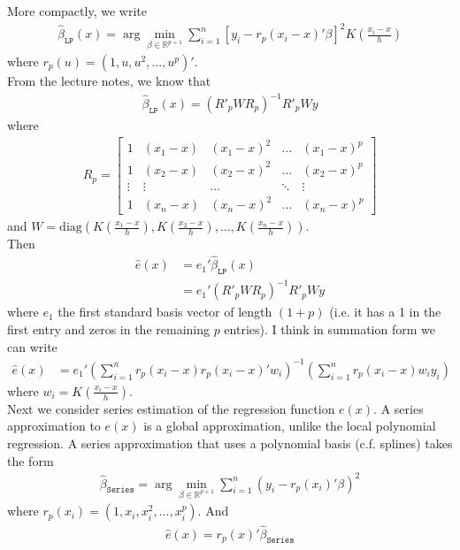\documentclass[12pt]{article}
\newcommand{\R}{\mathbb{R}}
\newcommand{\mtx}[1]{\ensuremath{\bm{\mathit{#1}}}}
\begin{document}
More compactly, we write
\begin{align*}
\hat{\mtx{\beta}}_{\texttt{LP}}(x)  = \arg \min_{\beta \in \R^{p+1}}\sum_{i=1}^n [y_i - \mtx{r}_p(x_i - x)'\mtx{\beta}]^2K\left(\frac{x_i - x}{h}\right)
\end{align*}
where $\mtx{r}_p(u)= (1 , u , u^2 ,...,u^p)'$. \\

From the lecture notes, we know that
\begin{align*}
\hat{\mtx{\beta}}_{\texttt{LP}}(x)  = (\mtx{R}'_p \mtx{W} \mtx{R}_p)^{-1}\mtx{R}'_p \mtx{W} \mtx{y}
\end{align*}
where
\begin{align*}
\mtx{R}_p = 
\begin{bmatrix}
1 & (x_1 - x) & (x_1-x)^2 & \dots& (x_1-x)^p \\
1 & (x_2 - x) & (x_2-x)^2 & \dots &(x_2-x)^p\\
\vdots & \vdots & \dots & \ddots & \vdots \\
1 & (x_n - x) & (x_n-x)^2 & \dots &(x_n-x)^p
\end{bmatrix}
\end{align*}
and $\mtx{W} = \text{diag}\left(K\left(\frac{x_1 - x}{h}\right), K\left(\frac{x_2 - x}{h}\right),..., K\left(\frac{x_n - x}{h}\right) \right)$.\\

Then
\begin{align*}
\hat{\mtx{e}}(x) &= \mtx{e}_1'\hat{\mtx{\beta}}_{\texttt{LP}}(x)  \\
&=\mtx{e}_1'(\mtx{R}'_p \mtx{W} \mtx{R}_p)^{-1}\mtx{R}'_p \mtx{W} \mtx{y}
\end{align*}
where $ \mtx{e}_1$ the first standard basis vector of length $(1+p)$ (i.e. it has a 1 in the first entry and zeros in the remaining $p$ entries). I think in summation form we can write
\begin{align*}
\hat{\mtx{e}}(x) &= \mtx{e}_1' (\sum_{i=1}^n \mtx{r}_p(x_i-x)\mtx{r}_p(x_i-x)' w_i)^{-1}(\sum_{i=1}^n \mtx{r}_p(x_i-x)w_iy_i)
\end{align*}
where $w_i = K\left(\frac{x_i - x}{h}\right)$.\\

Next we consider series estimation of the regression function $e(x)$. A series approximation to $e(x)$ is a global approximation, unlike the local polynomial regression. A series approximation that uses a polynomial basis (c.f. splines) takes the form
\begin{align*}
\hat{\mtx{\beta}}_{\texttt{Series}} = \arg \min_{\beta \in \R^{p+1}} \sum_{i=1}^n (y_i - \mtx{r}_p(x_i)' \mtx{\beta})^2
\end{align*}
where $\mtx{r}_p(x_i) = (1, x_i, x_i^2, ..., x_i^p)$. And
\begin{align*}
\hat e(x) =  \mtx{r}_p(x)'\hat{\mtx{\beta}}_{\texttt{Series}} 
\end{align*} 
\end{document}
